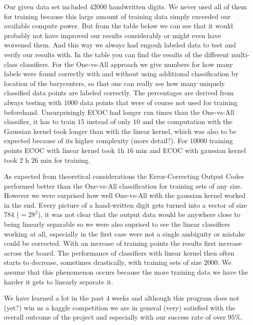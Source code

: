 \smallskip
Our given data set included $42 000$ handwritten digits. We never used all of them for training because this large amount of training data simply exceeded our available compute power. But from the table below we can see that it would probably not have improved our results considerably or might even have worsened them. And this way we always had engouh labeled data to test and verify our results with. In the table you can find the results of the different multi-class classifiers. For the One-vs-All approach we give numbers for how many labels were found correctly with and without using additional classification by location of the barycenters, so that one can really see how many uniquely classified data points are labeled correctly. The percentages are derived from always testing with $1000$ data points that were of course not used for training beforehand. Unsurprisingly ECOC had longer run times than the One-vs-All classifier, it has to train $15$ instead of only $10$ and the computation with the Gaussian kernel took longer than with the linear kernel, which was also to be expected because of its higher complexity (more detail?). For $10 000$ training points ECOC with linear kernel took $1$h $16$ min and ECOC with gaussian kernel took $2$ h $26$ min for training.  

\smallskip
As expected from theoretical considerations the Error-Correcting Output Codes performed better than the One-vs-All classification for training sets of any size. However we were surprised how well One-vs-All with the gaussian kernel worked in the end. Every picture of a hand-written digit gets turned into a vector of size $784$  ($=28^2$), it was not clear that the output data would be anywhere close to being linearly separable so we were also suprised to see the linear classifiers working at all, especially in the first case were not a single ambiguity or mistake could be corrected. With an increase of training points the results first increase across the board. The performance of classifiers with linear kernel then often starts to decrease, sometimes drastically, with training sets of size $2000$. We assume that this phenomenon occurs because the more training data we have the harder it gets to linearly separate it. 



We have learned a lot in the past 4 weeks and although this program does not (yet?) win us a kaggle competition we are in general (very) satisfied with the overall outcome of the project and especially with our success rate of over $95$\%.
